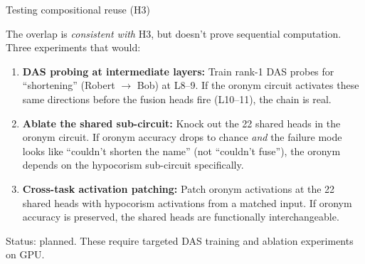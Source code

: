 \documentclass[10pt,aspectratio=169]{beamer}
\begin{document}
\begin{frame}{Testing compositional reuse (H3)}

The overlap is \emph{consistent with} H3, but doesn't prove sequential computation. Three experiments that would:

\vspace{0.5em}
\begin{enumerate}
  \item \textbf{DAS probing at intermediate layers:} Train rank-1 DAS probes for ``shortening'' (Robert $\to$ Bob) at L8--9. If the oronym circuit activates these same directions before the fusion heads fire (L10--11), the chain is real.

  \item \textbf{Ablate the shared sub-circuit:} Knock out the 22 shared heads in the oronym circuit. If oronym accuracy drops to chance \emph{and} the failure mode looks like ``couldn't shorten the name'' (not ``couldn't fuse''), the oronym depends on the hypocorism sub-circuit specifically.

  \item \textbf{Cross-task activation patching:} Patch oronym activations at the 22 shared heads with hypocorism activations from a matched input. If oronym accuracy is preserved, the shared heads are functionally interchangeable.
\end{enumerate}

\vspace{0.3em}
{\small Status: planned. These require targeted DAS training and ablation experiments on GPU.}
\end{frame}
\end{document}
